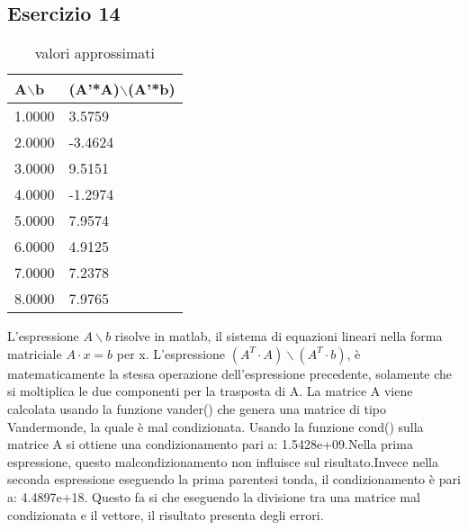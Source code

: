 \subsection{Esercizio 14}

\begin{table}[h]
\begin{tabular}{|l l|}
        \hline
        A$\backslash$b & (A’*A)$\backslash$(A’*b)\\
        \hline
        1.0000& 3.5759 \\
    	2.0000&-3.4624   \\
    	3.0000&  9.5151\\
    	4.0000&-1.2974\\
    	5.0000& 7.9574\\
    	6.0000& 4.9125\\
    	7.0000& 7.2378\\
    	8.0000& 7.9765\\
        \hline
\end{tabular}
\caption{valori approssimati}
\label{tab:14}     
\end{table}

L'espressione $A \backslash b$ risolve in matlab,  il sistema di equazioni lineari nella forma matriciale $A\cdot x=b$ per x.
L'espressione $(A^{T}\cdot A) \backslash (A^{T} \cdot b)$, è matematicamente la stessa operazione dell'espressione precedente, solamente che si moltiplica le due componenti per la trasposta di A. 
La matrice A viene calcolata usando la funzione vander() che genera una matrice di tipo Vandermonde, la quale è  mal condizionata. Usando la funzione cond() sulla matrice A si ottiene una condizionamento pari a: 1.5428e+09.Nella prima espressione, questo malcondizionamento non influisce sul risultato.Invece nella seconda espressione eseguendo la prima parentesi tonda, il condizionamento è pari a: 4.4897e+18. Questo fa si che eseguendo la divisione tra una matrice mal condizionata e il vettore, il risultato presenta degli errori.